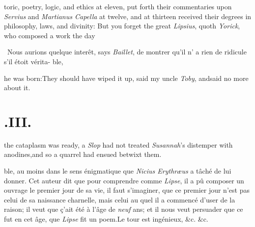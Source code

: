 \documentclass{article}
\begin{document}
toric, poetry, logic, and ethics at eleven,\break
\tsk put forth their commentaries upon\break
\textit{Servius} and \textit{Martianus Capella} at twelve,\break
\tsk and at thirteen received their degrees in
philosophy, laws, and divinity:\tsh\break
But you forget the great \textit{Lipsius}, quoth
\textit{Yorick}, who composed a work \lower -2pt\hbox{\ast} the day\break
{}

\vfill
\bgroup\footnotesize
\indent\fnast\ Nous aurions quelque interêt, says
\textit{Baillet}, de montrer qu’il n’ a rien de ridicule s’il étoit vérita-
\break\null\hfill ble,\par\egroup

\eject\noindent
he was born:\tsh They should have wiped it up, said my uncle
\textit{Toby}, and\break said no more about it.

\section{.\enspace III.}

 the cataplasm was ready, a\break
{}
\textit{Slop} had not treated
\textit{Susannah}’s distemper with anodines,\tsk and so a
quarrel had ensued betwixt them.

\vfill
\bgroup\footnotesize
\noindent
ble, au
moins dans le sens énigmatique que \textit{Nicius Erythræus} a tâché de lui donner.
Cet auteur dit que pour comprendre comme \textit{Lipse}, il a pû composer un ouvrage
le premier jour de sa vie, il faut s’imaginer, que ce premier jour n’est pas celui
de sa naissance charnelle, mais celui au quel il a commencé d’user de la raison; il
veut que ç’ait été à l’âge de \textit{neuf} ans; et il nous veut persuader que ce
fut en cet âge, que \textit{Lipse} fit un poem.\tsh Le tour est ingénieux, \&c.
\&c.\par\egroup
{}
\eject
\end{document}
